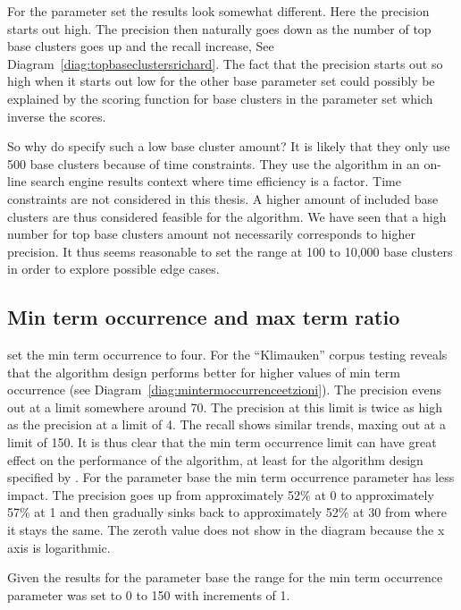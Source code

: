 For the \citeauthor{Moe2013compact} parameter set the results look somewhat different. Here the precision starts out high. The precision then naturally goes down as the number of top base clusters goes up and the recall increase, See Diagram~\ref{diag:topbaseclustersrichard}. The fact that the precision starts out so high when it starts out low for the other base parameter set could possibly be explained by the scoring function for base clusters in the \citeauthor{Moe2013compact} parameter set which inverse the scores.

So why do \cite{Oren1998} specify such a low base cluster amount? It is likely that they only use 500 base clusters because of time constraints. They use the algorithm in an on-line search engine results context where time efficiency is a factor. Time constraints are not considered in this thesis. A higher amount of included base clusters are thus considered feasible for the algorithm. We have seen that a high number for top base clusters amount not necessarily corresponds to higher precision. It thus seems reasonable to set the range at 100 to 10,000 base clusters in order to explore possible edge cases.

\subsection{Min term occurrence and max term ratio}
\citeauthor{Oren1998} set the min term occurrence to four. For the ``Klimauken'' corpus testing reveals that the \citeauthor{Oren1998} algorithm design performs better for higher values of min term occurrence (see Diagram~\ref{diag:mintermoccurrenceetzioni}). The precision evens out at a limit somewhere around 70. The precision at this limit is twice as high as the precision at a limit of 4. The recall shows similar trends, maxing out at a limit of 150. It is thus clear that the min term occurrence limit can have great effect on the performance of the \CTC algorithm, at least for the algorithm design specified by \citeauthor{Oren1998}. For the \citeauthor{Moe2013compact} parameter base the min term occurrence parameter has less impact. The precision goes up from approximately 52\% at 0 to approximately 57\% at 1 and then gradually sinks back to approximately 52\% at 30 from where it stays the same. The zeroth value does not show in the diagram because the x axis is logarithmic.

Given the results for the \citeauthor{Oren1998} parameter base the range for the min term occurrence parameter was set to 0 to 150 with increments of 1.

